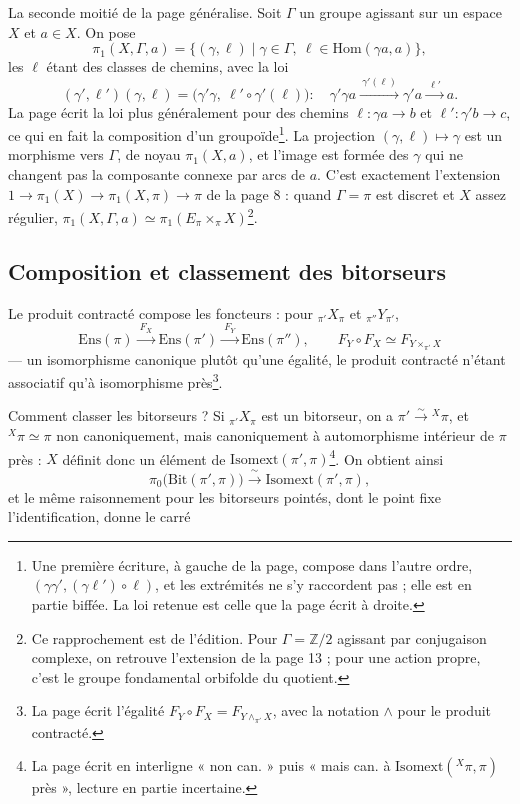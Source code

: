 \documentclass[11pt,a4paper]{article}
\begin{document}
La seconde moitié de la page généralise. Soit $\Gamma$ un groupe agissant sur un
espace $X$ et $a \in X$. On pose
\[
\pi_1(X, \Gamma, a) = \{(\gamma, \ell) \mid \gamma \in \Gamma, \ \ell \in \mathrm{Hom}(\gamma a, a)\},
\]
les $\ell$ étant des classes de chemins, avec la loi
\[
(\gamma', \ell')(\gamma, \ell) = \bigl(\gamma'\gamma, \ \ell' \circ \gamma'(\ell)\bigr) :
\quad \gamma'\gamma a \xrightarrow{\ \gamma'(\ell)\ } \gamma' a \xrightarrow{\ \ell'\ } a .
\]
La page écrit la loi plus généralement pour des chemins
$\ell : \gamma a \to b$ et $\ell' : \gamma' b \to c$, ce qui en fait la composition d'un
groupoïde\footnote{Une première écriture, à gauche de la page, compose dans
l'autre ordre, $(\gamma\gamma', (\gamma\ell')\circ\ell)$, et les extrémités ne s'y
raccordent pas ; elle est en partie biffée. La loi retenue est celle que la page
écrit à droite.}. La projection $(\gamma, \ell) \mapsto \gamma$ est un morphisme vers
$\Gamma$, de noyau $\pi_1(X, a)$, et l'image est formée des $\gamma$ qui ne changent pas
la composante connexe par arcs de $a$. C'est exactement l'extension
$1 \to \pi_1(X) \to \pi_1(X, \pi) \to \pi$ de la page 8 : quand $\Gamma = \pi$ est
discret et $X$ assez régulier, $\pi_1(X, \Gamma, a) \simeq \pi_1(E_\pi \times_\pi X)$\footnote{Ce rapprochement est
de l'édition. Pour $\Gamma = \mathbb{Z}/2$ agissant par conjugaison complexe, on
retrouve l'extension de la page 13 ; pour une action propre, c'est le groupe
fondamental orbifolde du quotient.}.

\subsection*{Composition et classement des bitorseurs}

Le produit contracté compose les foncteurs : pour ${}_{\pi'}X_{\pi}$ et
${}_{\pi''}Y_{\pi'}$,
\[
\mathrm{Ens}(\pi) \xrightarrow{\ F_X\ } \mathrm{Ens}(\pi') \xrightarrow{\ F_Y\ } \mathrm{Ens}(\pi''),
\qquad F_Y \circ F_X \simeq F_{Y \times_{\pi'} X}
\]
— un isomorphisme canonique plutôt qu'une égalité, le produit contracté n'étant
associatif qu'à isomorphisme près\footnote{La page écrit l'égalité
$F_Y \circ F_X = F_{Y \wedge_{\pi'} X}$, avec la notation $\wedge$ pour le produit
contracté.}.

Comment classer les bitorseurs ? Si ${}_{\pi'}X_{\pi}$ est un bitorseur, on a
$\pi' \xrightarrow{\sim} {}^{X}\pi$, et ${}^{X}\pi \simeq \pi$ non canoniquement, mais
canoniquement à automorphisme intérieur de $\pi$ près : $X$ définit donc un
élément de $\mathrm{Isomext}(\pi', \pi)$\footnote{La page écrit en interligne « non
can. » puis « mais can. à $\mathrm{Isomext}({}^X\pi, \pi)$ près », lecture en partie
incertaine.}. On obtient ainsi
\[
\pi_0\bigl(\mathrm{Bit}(\pi', \pi)\bigr) \xrightarrow{\ \sim\ } \mathrm{Isomext}(\pi', \pi),
\]
et le même raisonnement pour les bitorseurs pointés, dont le point fixe
l'identification, donne le carré
\end{document}
